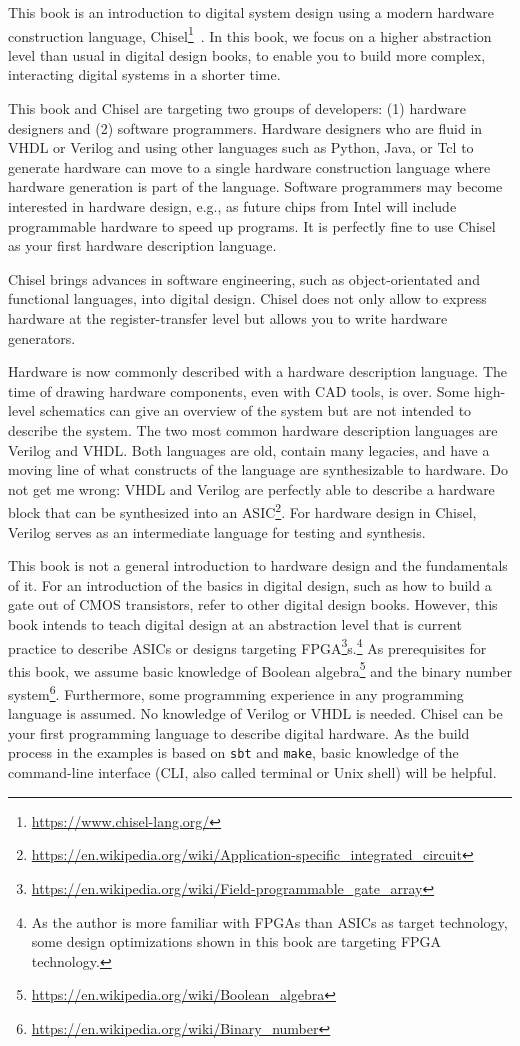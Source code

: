 \documentclass[%
    10pt,
    headinclude, footexclude,
    openright, %
    notitlepage,
    cleardoubleempty,
    headsepline,
    pointlessnumbers,
    bibtotoc, idxtotoc,
    ]{scrbook}
\newcommand{\code}[1]{{\small{\texttt{#1}}}}
\newcommand{\myref}[2]{\href{#1}{#2}}
\renewcommand{\myref}[2]{{#2}{\footnote{\url{#1}}}}
\begin{document}
This book is an introduction to digital system design using a modern hardware
construction language, \myref{https://www.chisel-lang.org/}{Chisel}~\cite{chisel:dac2012}.
In this book, we focus on a higher abstraction level than usual in digital design books,
to enable you to build more complex, interacting digital systems in a shorter time.

This book and Chisel are targeting two groups of developers:
(1) hardware designers and (2) software programmers.
Hardware designers who are fluid in VHDL or Verilog and using other languages such as Python,
Java, or Tcl to generate hardware can move to a single hardware construction language
where hardware generation is part of the language.
Software programmers may become interested in hardware design,
e.g., as future chips from Intel will include programmable hardware to speed up programs.
It is perfectly fine to use Chisel as your first hardware description language.

Chisel brings advances in software engineering, such as object-orientated
and functional languages, into digital design.
Chisel does not only allow to express hardware at the register-transfer level
but allows you to write hardware generators.

Hardware is now commonly described with a hardware description language.
The time of drawing hardware components, even with CAD tools, is
over. Some high-level schematics can give an overview of the system but are
not intended to describe the system.
The two most common hardware description languages are Verilog and VHDL.
Both languages are old, contain many legacies, and have a moving line of what
constructs of the language are synthesizable to hardware.
Do not get me wrong: VHDL and Verilog are perfectly able to describe a hardware
block that can be synthesized into an
\myref{https://en.wikipedia.org/wiki/Application-specific_integrated_circuit}{ASIC}.
For hardware design in Chisel, Verilog serves as an intermediate language
for testing and synthesis.

This book is not a general introduction to hardware design and the fundamentals of it.
For an introduction of the basics in digital design, such as how to build a gate out of
CMOS transistors, refer to other digital design books.
However, this book intends to teach digital design at an abstraction level that is
current practice to describe ASICs or designs targeting
\myref{https://en.wikipedia.org/wiki/Field-programmable_gate_array}{FPGA}s.\footnote{As the author is more familiar with FPGAs
than ASICs as target technology, some design optimizations shown in this book are
targeting FPGA technology.}
As prerequisites for this book, we assume basic knowledge of
\myref{https://en.wikipedia.org/wiki/Boolean_algebra}{Boolean algebra} and the
\myref{https://en.wikipedia.org/wiki/Binary_number}{binary number system}.
Furthermore, some programming experience in any programming language
is assumed. No knowledge of Verilog or VHDL is needed.
Chisel can be your first programming language to describe digital hardware.
As the build process in the examples is based on \code{sbt} and \code{make},
basic knowledge of the command-line interface (CLI, also called terminal or
Unix shell) will be helpful.
\end{document}
